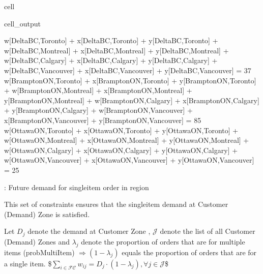 \documentclass[letterpaper,10pt,english]{jupyterBook}
\begin{document}
\begin{sphinxuseclass}{cell}
\begin{sphinxVerbatimOutput}
\begin{sphinxuseclass}{cell_output}
\begin{sphinxVerbatim}[commandchars=\\\{\}]
w[Delta\PYGZhy{}BC,Toronto] + x[Delta\PYGZhy{}BC,Toronto] + y[Delta\PYGZhy{}BC,Toronto] + w[Delta\PYGZhy{}BC,Montreal] + x[Delta\PYGZhy{}BC,Montreal] + y[Delta\PYGZhy{}BC,Montreal] + w[Delta\PYGZhy{}BC,Calgary] + x[Delta\PYGZhy{}BC,Calgary] + y[Delta\PYGZhy{}BC,Calgary] + w[Delta\PYGZhy{}BC,Vancouver] + x[Delta\PYGZhy{}BC,Vancouver] + y[Delta\PYGZhy{}BC,Vancouver]  \PYGZlt{}=  37
w[Brampton\PYGZhy{}ON,Toronto] + x[Brampton\PYGZhy{}ON,Toronto] + y[Brampton\PYGZhy{}ON,Toronto] + w[Brampton\PYGZhy{}ON,Montreal] + x[Brampton\PYGZhy{}ON,Montreal] + y[Brampton\PYGZhy{}ON,Montreal] + w[Brampton\PYGZhy{}ON,Calgary] + x[Brampton\PYGZhy{}ON,Calgary] + y[Brampton\PYGZhy{}ON,Calgary] + w[Brampton\PYGZhy{}ON,Vancouver] + x[Brampton\PYGZhy{}ON,Vancouver] + y[Brampton\PYGZhy{}ON,Vancouver]  \PYGZlt{}=  85
w[Ottawa\PYGZhy{}ON,Toronto] + x[Ottawa\PYGZhy{}ON,Toronto] + y[Ottawa\PYGZhy{}ON,Toronto] + w[Ottawa\PYGZhy{}ON,Montreal] + x[Ottawa\PYGZhy{}ON,Montreal] + y[Ottawa\PYGZhy{}ON,Montreal] + w[Ottawa\PYGZhy{}ON,Calgary] + x[Ottawa\PYGZhy{}ON,Calgary] + y[Ottawa\PYGZhy{}ON,Calgary] + w[Ottawa\PYGZhy{}ON,Vancouver] + x[Ottawa\PYGZhy{}ON,Vancouver] + y[Ottawa\PYGZhy{}ON,Vancouver]  \PYGZlt{}=  25
\end{sphinxVerbatim}

\end{sphinxuseclass}\end{sphinxVerbatimOutput}

\end{sphinxuseclass}
\sphinxAtStartPar
{}: Future demand for single\sphinxhyphen{}item order in region 

\sphinxAtStartPar
This set of constraints ensures that the single\sphinxhyphen{}item demand at Customer (Demand) Zone  is satisfied.

\sphinxAtStartPar
Let \(D_j\) denote the demand at Customer Zone , \(\mathcal{J}\) denote the list of all Customer (Demand) Zones and \(\lambda_j\) denote the proportion of orders that are for multiple items (probMultiItem) \(\Rightarrow\left(1-\lambda_j\right)\) equals the proportion of orders that are for a single item.
\$\(\sum_{i \in \mathcal{FC}} w_{ij} = D_j \cdot \left( 1-\lambda_j \right), \forall j\in \mathcal{J} \)\$
\end{document}
